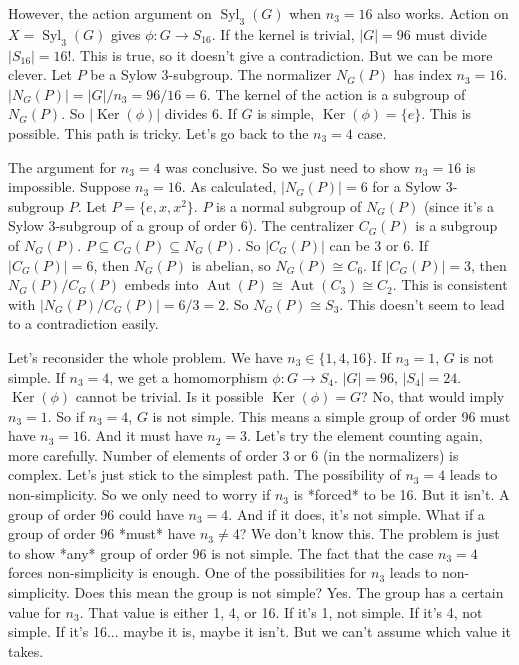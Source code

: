 \documentclass[12pt,a4paper]{article}
\theoremstyle{plain} %
\theoremstyle{definition} %
\theoremstyle{remark} %
\DeclareMathOperator{\Syl}{Syl}
\DeclareMathOperator{\Aut}{Aut}
\DeclareMathOperator{\Ker}{Ker}
\begin{document}
However, the action argument on $\Syl_3(G)$ when $n_3=16$ also works.
Action on $X=\Syl_3(G)$ gives $\phi: G \to S_{16}$.
If the kernel is trivial, $|G|=96$ must divide $|S_{16}|=16!$. This is true, so it doesn't give a contradiction.
But we can be more clever. Let $P$ be a Sylow 3-subgroup. The normalizer $N_G(P)$ has index $n_3=16$.
$|N_G(P)| = |G|/n_3 = 96/16 = 6$.
The kernel of the action is a subgroup of $N_G(P)$. So $|\Ker(\phi)|$ divides 6.
If $G$ is simple, $\Ker(\phi)=\{e\}$. This is possible.
This path is tricky. Let's go back to the $n_3=4$ case.

The argument for $n_3=4$ was conclusive. So we just need to show $n_3=16$ is impossible.
Suppose $n_3=16$. As calculated, $|N_G(P)|=6$ for a Sylow 3-subgroup $P$.
Let $P = \{e, x, x^2\}$. $P$ is a normal subgroup of $N_G(P)$ (since it's a Sylow 3-subgroup of a group of order 6).
The centralizer $C_G(P)$ is a subgroup of $N_G(P)$.
$P \subseteq C_G(P) \subseteq N_G(P)$.
So $|C_G(P)|$ can be 3 or 6.
If $|C_G(P)|=6$, then $N_G(P)$ is abelian, so $N_G(P) \cong C_6$.
If $|C_G(P)|=3$, then $N_G(P)/C_G(P)$ embeds into $\Aut(P) \cong \Aut(C_3) \cong C_2$. This is consistent with $|N_G(P)/C_G(P)|=6/3=2$. So $N_G(P) \cong S_3$.
This doesn't seem to lead to a contradiction easily.

Let's reconsider the whole problem. We have $n_3 \in \{1, 4, 16\}$.
If $n_3=1$, $G$ is not simple.
If $n_3=4$, we get a homomorphism $\phi: G \to S_4$. $|G|=96$, $|S_4|=24$. $\Ker(\phi)$ cannot be trivial. Is it possible $\Ker(\phi)=G$? No, that would imply $n_3=1$. So if $n_3=4$, $G$ is not simple.
This means a simple group of order 96 must have $n_3=16$.
And it must have $n_2=3$.
Let's try the element counting again, more carefully.
Number of elements of order 3 or 6 (in the normalizers) is complex.
Let's just stick to the simplest path. The possibility of $n_3=4$ leads to non-simplicity. So we only need to worry if $n_3$ is *forced* to be 16. But it isn't. A group of order 96 could have $n_3=4$. And if it does, it's not simple. What if a group of order 96 *must* have $n_3 \neq 4$? We don't know this. The problem is just to show *any* group of order 96 is not simple. The fact that the case $n_3=4$ forces non-simplicity is enough. One of the possibilities for $n_3$ leads to non-simplicity. Does this mean the group is not simple? Yes. The group has a certain value for $n_3$. That value is either 1, 4, or 16. If it's 1, not simple. If it's 4, not simple. If it's 16... maybe it is, maybe it isn't. But we can't assume which value it takes.
\end{document}

